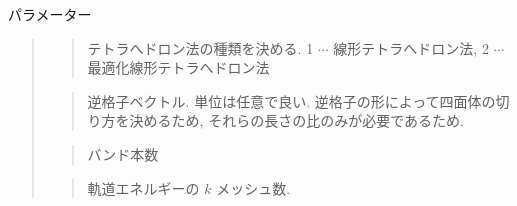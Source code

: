 \documentclass[letterpaper,10pt,dvipdfmx,openany]{sphinxmanual}
\begin{document}
\sphinxAtStartPar
パラメーター
\begin{quote}

\begin{sphinxVerbatim}[commandchars=\\\{\}]
\end{sphinxVerbatim}
\begin{quote}

\sphinxAtStartPar
テトラへドロン法の種類を決める.
1 \(\cdots\) 線形テトラへドロン法,
2 \(\cdots\) 最適化線形テトラへドロン法 {\hyperref[\detokenize{ref:ref}]{}}
\end{quote}

\begin{sphinxVerbatim}[commandchars=\\\{\}]
\end{sphinxVerbatim}
\begin{quote}

\sphinxAtStartPar
逆格子ベクトル. 単位は任意で良い.
逆格子の形によって四面体の切り方を決めるため,
それらの長さの比のみが必要であるため.
\end{quote}

\begin{sphinxVerbatim}[commandchars=\\\{\}]
\end{sphinxVerbatim}
\begin{quote}

\sphinxAtStartPar
バンド本数
\end{quote}

\begin{sphinxVerbatim}[commandchars=\\\{\}]
\end{sphinxVerbatim}
\begin{quote}

\sphinxAtStartPar
軌道エネルギーの \(k\) メッシュ数.
\end{quote}


\end{quote}
\end{document}
